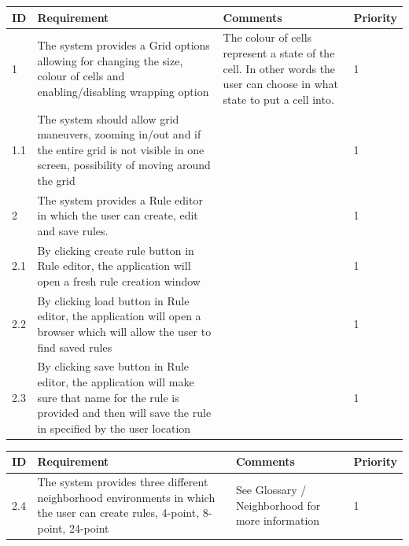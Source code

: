 \documentclass{article}
\begin{document}
\begin{center}
\hspace*{-2.1cm}
	\begin{tabular}{| l | p{7cm} | p{5cm} | l |}
	
		\hline
	  	ID & Requirement & Comments & Priority \\
		\hline
		
		1 & 
		The system provides a Grid options
		allowing for changing the size, colour of cells and
		enabling/disabling wrapping option&
		The colour of cells represent a state of the cell.
		In other words the user can choose in what state to put a cell into. &
		1 
		\\ \hline

		1.1 & 
		The system should allow grid maneuvers, zooming in/out and if the
		entire grid is not visible in one screen, possibility of moving around the grid&
		 &
		1 
		\\ \hline

		2 & 
		The system provides a Rule editor in which
		the user can create, edit and save rules. & 
		 &
		1 
		\\ \hline
		
		2.1 & 
		By clicking create rule button in Rule editor, the application will open a fresh rule
		creation window & 
		 &
		1 
		\\ \hline

		2.2 & 
		By clicking load button in Rule editor, the application will open a browser which
		will allow the user to find saved rules & 
		 &
		1 
		\\ \hline

		2.3 & 
		By clicking save button in Rule editor, the application will make sure that name for the
		rule is provided and then will save the rule in specified by the user location & 
		 &
		1 

		\\ \hline


	  \hline
	\end{tabular}
\hspace*{-2.1cm}
	\begin{tabular}{| l | p{7cm} | p{5cm} | l |}
		\hline
	  	ID & Requirement & Comments & Priority \\
		\hline

		2.4 & 
		The system provides three different neighborhood environments
		in which the user can create rules, 4-point, 8-point, 24-point  & 
		See Glossary / Neighborhood for more information &
		1 
		\\ \hline
		


\end{tabular}
\end{center}
\end{document}
